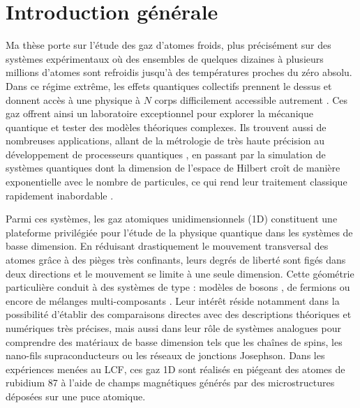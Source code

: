 
\chapter*{Introduction générale}
\minitoc


Ma thèse porte sur l’étude des gaz d’atomes froids, plus précisément sur  des systèmes expérimentaux où des ensembles de quelques dizaines à plusieurs millions d’atomes sont refroidis jusqu’à des températures proches du zéro absolu. Dans ce régime extrême, les effets quantiques collectifs prennent le dessus et donnent accès à une physique à $N$ corps difficilement accessible autrement \cite{RevModPhys.80.885}. Ces gaz offrent ainsi un laboratoire exceptionnel pour explorer la mécanique quantique et tester des modèles théoriques complexes. Ils trouvent aussi de nombreuses applications, allant de la métrologie de très haute précision au développement de processeurs quantiques \cite{PhysRevLett.96.010401}, en passant par la simulation de systèmes quantiques dont la dimension de l’espace de Hilbert croît de manière exponentielle avec le nombre de particules, ce qui rend leur traitement classique rapidement inabordable \cite{Nielsen2010,Feynman1982}.%

\medskip 

Parmi ces systèmes, les gaz atomiques unidimensionnels (1D) constituent une plateforme privilégiée pour l’étude de la physique quantique dans les systèmes de basse dimension. En réduisant drastiquement le mouvement transversal des atomes grâce à des pièges très confinants, leurs degrés de liberté sont figés dans deux directions et le mouvement se limite à une seule dimension. Cette géométrie particulière conduit à des systèmes de type : modèles de bosons \cite{Bloch2005,Kinoshita2004,Haller2009,Amerongen2008,Jacqmin2011}, de fermions \cite{Guan2013,Liao2010,Moritz2005} ou encore de mélanges multi-composants \cite{Pagano2014}. Leur intérêt réside notamment dans la possibilité d’établir des comparaisons directes avec des descriptions théoriques et numériques très précises, mais aussi dans leur rôle de systèmes analogues pour comprendre des matériaux de basse dimension tels que les chaînes de spins, les nano-fils supraconducteurs ou les réseaux de jonctions Josephson. Dans les expériences menées au \gls{LCF}, ces gaz 1D sont réalisés en piégeant des atomes de rubidium 87 à l’aide de champs magnétiques générés par des microstructures déposées sur une puce atomique.

